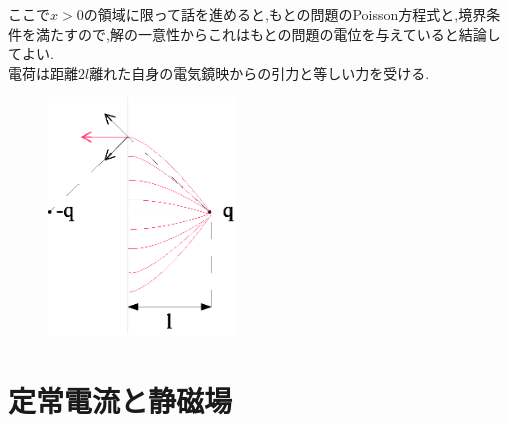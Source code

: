 \documentclass{jsarticle}
\begin{document}
ここで$x>0$の領域に限って話を進めると,もとの問題のPoisson方程式と,境界条件を満たすので,解の一意性からこれはもとの問題の電位を与えていると結論してよい. \\
電荷は距離$2l$離れた自身の電気鏡映からの引力と等しい力を受ける. \\
\begin{figure}[htbp]
 \begin{center}
  \includegraphics[width=50mm]{7.5.eps}
 \end{center}
 \caption{}
 \label{fig:five}
\end{figure}
\newpage
\section{定常電流と静磁場}
\end{document}
